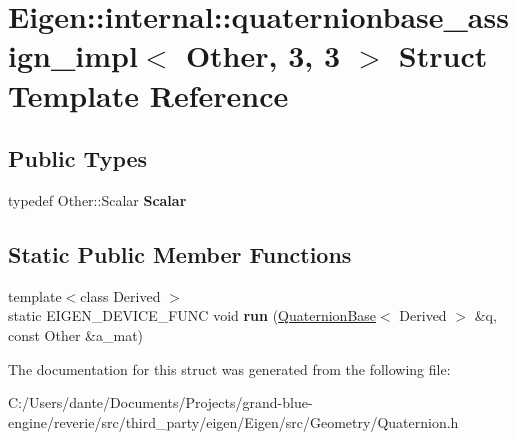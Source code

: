 \hypertarget{struct_eigen_1_1internal_1_1quaternionbase__assign__impl_3_01_other_00_013_00_013_01_4}{}\section{Eigen\+::internal\+::quaternionbase\+\_\+assign\+\_\+impl$<$ Other, 3, 3 $>$ Struct Template Reference}
\label{struct_eigen_1_1internal_1_1quaternionbase__assign__impl_3_01_other_00_013_00_013_01_4}
\subsection*{Public Types}
\begin{DoxyCompactItemize}
\item 
\mbox{\label{struct_eigen_1_1internal_1_1quaternionbase__assign__impl_3_01_other_00_013_00_013_01_4_a8fde3fdd643634fe7a9e38b90d80519a}} 
typedef Other\+::\+Scalar {\bfseries Scalar}
\end{DoxyCompactItemize}
\subsection*{Static Public Member Functions}
\begin{DoxyCompactItemize}
\item 
\mbox{\label{struct_eigen_1_1internal_1_1quaternionbase__assign__impl_3_01_other_00_013_00_013_01_4_a2cb5f61272d2ce9595659a111bf5efb9}} 
{\footnotesize template$<$class Derived $>$ }\\static E\+I\+G\+E\+N\+\_\+\+D\+E\+V\+I\+C\+E\+\_\+\+F\+U\+NC void {\bfseries run} (\mbox{\hyperlink{class_eigen_1_1_quaternion_base}{Quaternion\+Base}}$<$ Derived $>$ \&q, const Other \&a\+\_\+mat)
\end{DoxyCompactItemize}


The documentation for this struct was generated from the following file\+:\begin{DoxyCompactItemize}
\item 
C\+:/\+Users/dante/\+Documents/\+Projects/grand-\/blue-\/engine/reverie/src/third\+\_\+party/eigen/\+Eigen/src/\+Geometry/Quaternion.\+h\end{DoxyCompactItemize}
